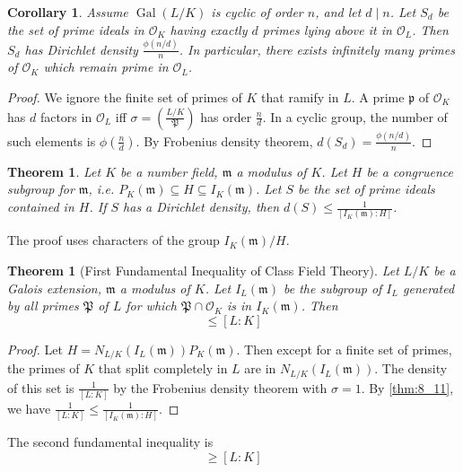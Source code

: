 \documentclass[11pt]{article}
\theoremstyle{definition}
\theoremstyle{plain}
\newtheorem{theorem}[definition]{Theorem}
\newtheorem{corollary}[definition]{Corollary}
\theoremstyle{remark}
\DeclareMathOperator{\Gal}{Gal}
\newcommand{\cO}{\mathcal{O}}
\newcommand{\cp}{\mathfrak{P}}
\newcommand{\fp}{\mathfrak{p}}
\newcommand{\fm}{\mathfrak{m}}
\newcommand{\leg}[2]{\left(\frac{#1}{#2}\right)}
\begin{document}
\begin{corollary}\label{cor:8_10}
    Assume $\Gal(L/K)$ is cyclic of order $n$, and let $d \mid n$. Let $S_d$ be the set of prime ideals in $\cO_K$ having exactly $d$ primes lying above it in $\cO_L$. Then $S_d$ has Dirichlet density $\frac{\phi(n/d)}{n}$. In particular, there exists infinitely many primes of $\cO_K$ which remain prime in $\cO_L$.
\end{corollary}
\begin{proof}
    We ignore the finite set of primes of $K$ that ramify in $L$. A prime $\fp$ of $\cO_K$ has $d$ factors in $\cO_L$ iff $\sigma = \leg{L/K}{\cp}$ has order $\frac{n}{d}$. In a cyclic group, the number of such elements is $\phi\left(\frac{n}{d}\right)$. By Frobenius density theorem, $d(S_d) = \frac{\phi(n/d)}{n}$.
\end{proof}

\begin{theorem}\label{thm:8_11}
    Let $K$ be a number field, $\fm$ a modulus of $K$. Let $H$ be a congruence subgroup for $\fm$, i.e. $P_K(\fm) \subseteq H \subseteq I_K(\fm)$. Let $S$ be the set of prime ideals contained in $H$. If $S$ has a Dirichlet density, then $d(S) \le \frac{1}{[I_K(\fm):H]}$.
\end{theorem}
\noindent The proof uses characters of the group $I_K(\fm) / H$.

\begin{theorem}[First Fundamental Inequality of Class Field Theory]\label{thm:8_12}
    Let $L/K$ be a Galois extension, $\fm$ a modulus of $K$. Let $I_L(\fm)$ be the subgroup of $I_L$ generated by all primes $\cp$ of $L$ for which $\cp \cap \cO_K$ is in $I_K(\fm)$. Then
    \begin{equation*}
        [I_K(\fm) : N_{L/K}(I_L(\fm)) P_K(\fm)] \le [L:K]
    \end{equation*}
\end{theorem}
\begin{proof}
    Let $H = N_{L/K}(I_L(\fm)) P_K(\fm)$. Then except for a finite set of primes, the primes of $K$ that split completely in $L$ are in $N_{L/K}(I_L(\fm))$. The density of this set is $\frac{1}{[L:K]}$ by the Frobenius density theorem with $\sigma = 1$. By \autoref{thm:8_11}, we have $\frac{1}{[L:K]} \le \frac{1}{[I_K(\fm) : H]}$.
\end{proof}

\noindent The second fundamental inequality is
\begin{equation*}
    [I_K(\fm) : N_{L/K}(I_L(\fm)) P_K(\fm)] \ge [L : K]
\end{equation*}
\end{document}
